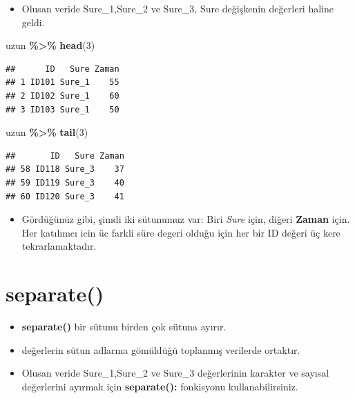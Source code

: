 \documentclass[
  oneside]{book}
\newenvironment{Shaded}{\begin{snugshade}}{\end{snugshade}}
\newcommand{\DecValTok}[1]{\textcolor[rgb]{0.00,0.00,0.81}{#1}}
\newcommand{\FunctionTok}[1]{\textcolor[rgb]{0.13,0.29,0.53}{\textbf{#1}}}
\newcommand{\NormalTok}[1]{#1}
\newcommand{\SpecialCharTok}[1]{\textcolor[rgb]{0.81,0.36,0.00}{\textbf{#1}}}
\providecommand{\tightlist}{%
  \setlength{\itemsep}{0pt}\setlength{\parskip}{0pt}}
\begin{document}
\begin{itemize}
\tightlist
\item
  Olusan veride Sure\_1,Sure\_2 ve Sure\_3, Sure değişkenin değerleri haline geldi.
\end{itemize}

\begin{Shaded}
\begin{Highlighting}[]
\NormalTok{uzun }\SpecialCharTok{\%\textgreater{}\%} \FunctionTok{head}\NormalTok{(}\DecValTok{3}\NormalTok{)}
\end{Highlighting}
\end{Shaded}

\begin{verbatim}
##      ID   Sure Zaman
## 1 ID101 Sure_1    55
## 2 ID102 Sure_1    60
## 3 ID103 Sure_1    50
\end{verbatim}

\begin{Shaded}
\begin{Highlighting}[]
\NormalTok{uzun }\SpecialCharTok{\%\textgreater{}\%} \FunctionTok{tail}\NormalTok{(}\DecValTok{3}\NormalTok{)}
\end{Highlighting}
\end{Shaded}

\begin{verbatim}
##       ID   Sure Zaman
## 58 ID118 Sure_3    37
## 59 ID119 Sure_3    40
## 60 ID120 Sure_3    41
\end{verbatim}

\begin{itemize}
\tightlist
\item
  Gördüğünüz gibi, şimdi iki sütunumuz var: Biri \emph{Sure} için, diğeri \textbf{Zaman} için. Her katılımcı icin üc farkli süre degeri olduğu için her bir ID değeri üç kere tekrarlamaktadır.
\end{itemize}

\hypertarget{separate}{%
\section{\texorpdfstring{\textbf{separate()}}{separate()}}\label{separate}}

\begin{itemize}
\item
  \textbf{separate()} bir sütunu birden çok sütuna ayırır.
\item
  değerlerin sütun adlarına gömüldüğü toplanmış verilerde ortaktır.
\item
  Olusan veride Sure\_1,Sure\_2 ve Sure\_3 değerlerinin karakter ve sayısal değerlerini ayırmak için \textbf{separate():} fonkisyonu kullanabilirsiniz.
\end{itemize}
\end{document}
